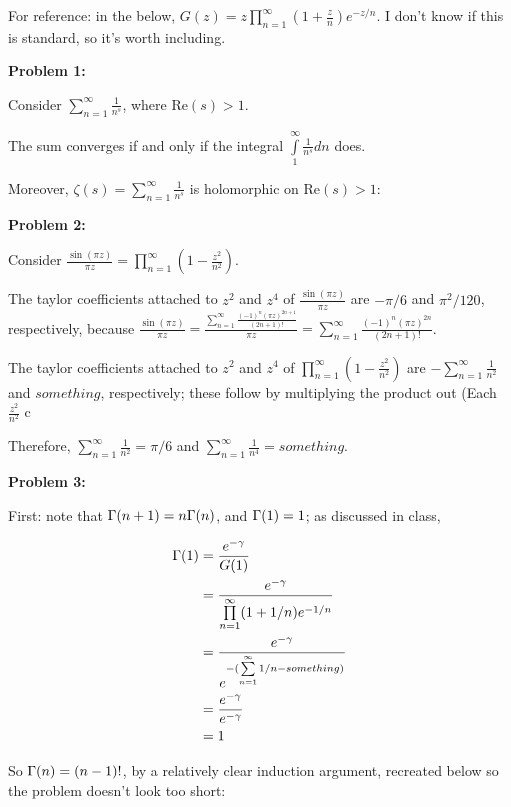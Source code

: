 \documentclass[a4paper,12pt]{article}
\begin{document}
For reference: in the below, $G(z) = z \prod\limits_{n=1}^\infty (1+\frac{z}{n}) e^{-z/n}$. I don't know if this is standard, so it's worth including.

{\bf Problem 1:}

Consider $\sum\limits_{n=1}^\infty \frac{1}{n^s}$, where $\text{Re}(s) > 1$.

The sum converges if and only if the integral $\int\limits_1^\infty \frac{1}{n^s} dn$ does. %

Moreover, $\zeta(s) = \sum\limits_{n=1}^\infty \frac{1}{n^s}$ is holomorphic on $\text{Re}(s) >1$: %

\shunt

{\bf Problem 2:}

Consider $\frac{\sin(\pi z)}{\pi z} = \prod\limits_{n=1}^\infty (1-\frac{z^2}{n^2})$.

The taylor coefficients attached to $z^2$ and $z^4$ of $\frac{\sin(\pi z)}{\pi z}$ are $-\pi/6$ and $\pi^2/120$, respectively, because $\frac{\sin(\pi z)}{\pi z} = \frac{\sum\limits_{n=1}^\infty \frac{(-1)^n(\pi z)^{2n+1}}{(2n+1)!}}{\pi z} = \sum\limits_{n=1}^\infty \frac{(-1)^n(\pi z)^{2n}}{(2n+1)!}$.

The taylor coefficients attached to $z^2$ and $z^4$ of $\prod\limits_{n=1}^\infty (1-\frac{z^2}{n^2})$ are $-\sum\limits_{n=1}^\infty \frac{1}{n^2}$ and $something$, respectively; these follow by multiplying the product out (Each $\frac{z^2}{n^2}$ c

Therefore, $\sum\limits_{n=1}^\infty \frac{1}{n^2} = \pi/6$ and $\sum\limits_{n=1}^\infty \frac{1}{n^4} = something$.

\shunt

{\bf Problem 3:}

First: note that $\Gamma(n+1) = n\Gamma(n)$, and $\Gamma(1) = 1$; as discussed in class, 

\begin{align*}
\Gamma(1) &= \frac{e^{-\gamma}}{G(1)}\\
&= \frac{e^{-\gamma}}{\prod\limits_{n=1}^\infty (1+1/n)e^{-1/n}}\\
&= \frac{e^{-\gamma}}{e^{-(\sum\limits_{n=1}^\infty 1/n - something)}}\\
&= \frac{e^{-\gamma}}{e^{-\gamma}}\\
&= 1
\end{align*} %

So $\Gamma(n) = (n-1)!$, by a relatively clear induction argument, recreated below so the problem doesn't look too short:
\end{document}
